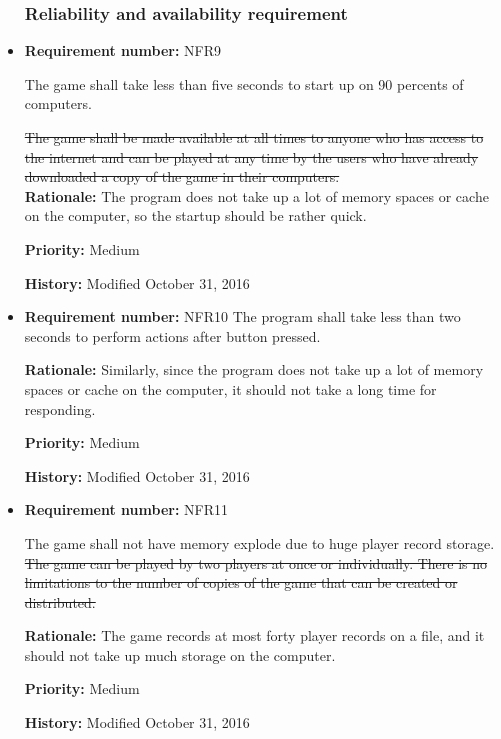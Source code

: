 \documentclass[12pt,letterpaper]{article}
\begin{document}
\begin{reqbox}
	\begin{itemize}

\subsubsection{Reliability and availability requirement}

\item \textbf{Requirement number: }NFR9

		The game shall take less than five seconds to start up on 90 percents of computers.

\st{   	The game shall be made available at all times to anyone who has access to the internet and can be played at any time by the users who have already downloaded a copy of the game in their computers.\\
}
		\textbf{Rationale: } The program does not take up a lot of memory spaces or cache on the computer, so the startup should be rather quick.

		\textbf{Priority: }Medium

		\textbf{History: }Modified October 31, 2016

		\item \textbf{Requirement number: }NFR10	
		The program shall take less than two seconds to perform actions after button pressed. 

		\textbf{Rationale: } Similarly, since the program does not take up a lot of memory spaces or cache on the computer, it should not take a long time for responding.

		\textbf{Priority: }Medium

		\textbf{History: }Modified October 31, 2016

	\end{itemize}
\end{reqbox}

\begin{reqbox}
	\begin{itemize}

\subsubsection{Capacity requirement}

\item \textbf{Requirement number: }NFR11

		The game shall not have memory explode due to huge player record storage.
\st{   	The game can be played by two players at once or individually. There is no limitations to the number of copies of the game that can be created or distributed.\\
}

		\textbf{Rationale: } The game records at most forty player records on a file, and it should not take up much storage on the computer.

		\textbf{Priority: }Medium

		\textbf{History: }Modified October 31, 2016


	\end{itemize}
\end{reqbox}
\end{document}
